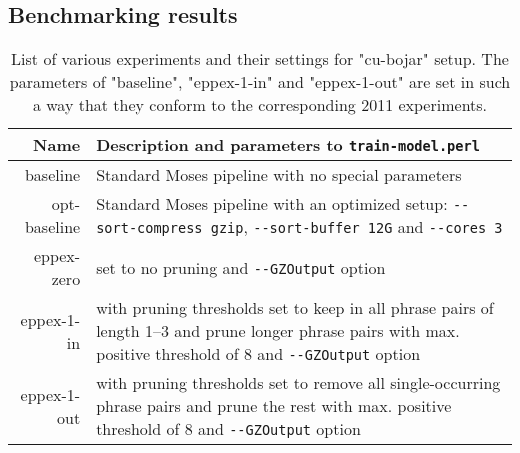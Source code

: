 \subsection{Benchmarking results}

\begin{table}[h]
\centering
\begin{tabular}{ r p{10cm} }
Name & Description and parameters to \verb|train-model.perl| \\
\hline
\hline
baseline & Standard Moses pipeline with no special parameters \\
opt-baseline & Standard Moses pipeline with an optimized setup:
\verb|--sort-compress gzip|, \verb|--sort-buffer 12G| and \verb|--cores 3| \\
eppex-zero & \eppex{} set to no pruning and \verb|--GZOutput| option \\
eppex-1-in & \eppex{} with pruning thresholds set to keep in
all phrase pairs of length 1--3 and prune longer phrase pairs
with max. positive threshold of 8 and \verb|--GZOutput| option \\
eppex-1-out & \eppex{} with pruning thresholds set to remove
all single-occurring phrase pairs and prune the rest with
max. positive threshold of 8 and \verb|--GZOutput| option \\
\hline
\hline
\end{tabular}
\caption{\label{cu-bojar-scenarios}List of various experiments and their
settings for "cu-bojar" setup. The parameters of "baseline", "eppex-1-in"
and "eppex-1-out" are set in such a way that they conform to the
corresponding 2011 experiments.}
\end{table}
